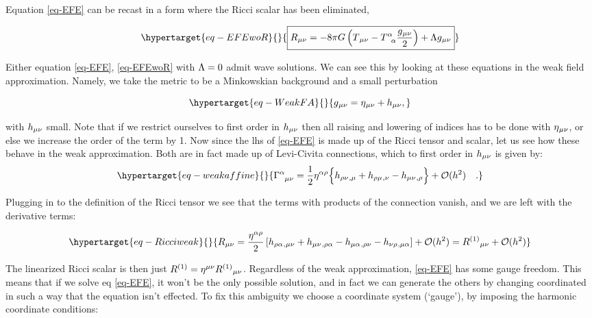 \documentclass[
  10pt,
  a4paper,
  DIV=11,
  numbers=noendperiod,
  oneside]{scrreprt}
\DeclareRobustCommand{\[}{\begin{equation}}
\DeclareRobustCommand{\]}{\end{equation}}
\begin{document}
Equation \ref{eq-EFE} can be recast in a form where the Ricci scalar has
been eliminated,

\begin{equation}\protect\hypertarget{eq-EFEwoR}{}{
\boxed{\RicciTco=-8 \pi \grav\left(\SEco-\trSE \frac{\met}{2}\right)+\cosmo \met} 
}\label{eq-EFEwoR}\end{equation}

Either equation \ref{eq-EFE}, \ref{eq-EFEwoR} with \(\Lambda=0\) admit
wave solutions. We can see this by looking at these equations in the
weak field approximation. Namely, we take the metric to be a Minkowskian
background and a small perturbation

\begin{equation}\protect\hypertarget{eq-WeakFA}{}{
    \met = \mink + \weakmet,
}\label{eq-WeakFA}\end{equation}

with \(h{}_{\mu\nu}\) small. Note that if we restrict ourselves to first
order in \(h{}_{\mu\nu}\) then all raising and lowering of indices has to be
done with \(\eta{}_{\mu\nu}\), or else we increase the order of the term by 1. Now
since the \gls{lhs} of \ref{eq-EFE} is made up of the Ricci tensor and
scalar, let us see how these behave in the weak approximation. Both are
in fact made up of Levi-Civita connections, which to first order in
\(h{}_{\mu\nu}\) is given by:
\begin{equation}\protect\hypertarget{eq-weakaffine}{}{\LC{\alpha}{\mu}{\nu} = \frac{1}{2} \invmink[\alpha \rho]
\brk[\Big]{
    \ipdv{ \weakmet[\rho \nu]}{\mu}
    +\ipdv{ \weakmet[\rho \mu]}{\nu}
    -\ipdv{ \weakmet}{\rho}} + \order[2]{h}\quad .}\label{eq-weakaffine}\end{equation}

Plugging in to the definition of the Ricci tensor we see that the terms
with products of the connection vanish, and we are left with the
derivative terms:

\begin{equation}\protect\hypertarget{eq-Ricciweak}{}{ 
\RicciTco  =
 \frac{\invmink[\alpha\rho]}{2}\left[ \ipdv{\weakmet[\rho\alpha]}{\mu\nu} + \ipdv{\weakmet}{\rho\alpha} - \ipdv{\weakmet[\mu\alpha]}{\rho\nu} - \ipdv{\weakmet[\nu\rho]}{\mu\alpha} \right] + \mathcal{O}(h^2)=\linRicciTco+ \mathcal{O}(h^2)
}\label{eq-Ricciweak}\end{equation}

The linearized Ricci scalar is then just
\(R^{(1)}=\eta{}^{\mu\nu}R^{(1)}{}_{\mu\nu}\). Regardless of the weak
approximation, \ref{eq-EFE} has some gauge freedom. This means that if
we solve eq \ref{eq-EFE}, it won't be the only possible solution, and in
fact we can generate the others by changing coordinated in such a way
that the equation isn't effected. To fix this ambiguity we choose a
coordinate system (`gauge'), by imposing the harmonic coordinate
conditions:
\end{document}
